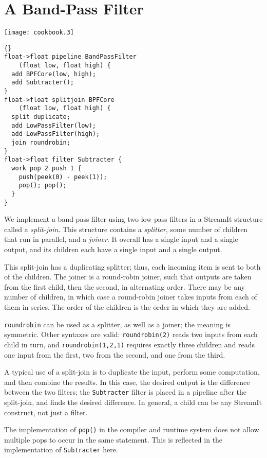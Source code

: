 \clearpage
\section{A Band-Pass Filter}

\begin{textpic}{\texttt{[image: cookbook.3]}}
\begin{lstlisting}{}
float->float pipeline BandPassFilter
    (float low, float high) {
  add BPFCore(low, high);
  add Subtracter();
}
float->float splitjoin BPFCore
    (float low, float high) {
  split duplicate;
  add LowPassFilter(low);
  add LowPassFilter(high);
  join roundrobin;
}
float->float filter Subtracter {
  work pop 2 push 1 {
    push(peek(0) - peek(1));
    pop(); pop();
  }
}
\end{lstlisting}
\end{textpic}

We implement a band-pass filter using two low-pass filters in a
StreamIt structure called a \emph{split-join}.  This structure
contains a \emph{splitter}, some number of children that run in
parallel, and a \emph{joiner}.  It overall has a single input and a
single output, and its children each have a single input and a single
output.

This split-join has a duplicating splitter; thus, each incoming item
is sent to both of the children.  The joiner is a round-robin joiner,
such that outputs are taken from the first child, then the second, in
alternating order.  There may be any number of children, in which case
a round-robin joiner takes inputs from each of them in series.  The
order of the children is the order in which they are added.

\lstinline|roundrobin| can be used as a splitter, as well as a joiner;
the meaning is symmetric.  Other syntaxes are valid:
\lstinline|roundrobin(2)| reads two inputs from each child in turn,
and \lstinline|roundrobin(1,2,1)| requires exactly three children and
reads one input from the first, two from the second, and one from the
third.

A typical use of a split-join is to duplicate the input, perform some
computation, and then combine the results.  In this case, the desired
output is the difference between the two filters; the
\lstinline|Subtracter| filter is placed in a pipeline after the
split-join, and finds the desired difference.  In general, a child can
be any StreamIt construct, not just a filter.

The implementation of \lstinline|pop()| in the compiler and runtime
system does not allow multiple pops to occur in the same statement.
This is reflected in the implementation of \lstinline|Subtracter|
here.